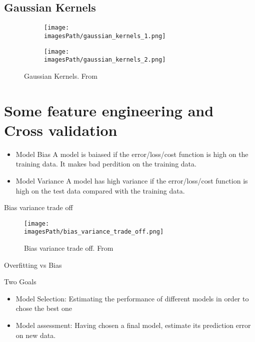 \begin{multicols}{2}
\subsection{Gaussian Kernels}
\begin{figure}
     \centering
     \begin{subfigure}[b]{8cm}
         \centering
         \texttt{[image: \\imagesPath/gaussian\_kernels\_1.png]}
     \end{subfigure}
     \hfill
     \begin{subfigure}[b]{8cm}
         \centering
         \texttt{[image: \\imagesPath/gaussian\_kernels\_2.png]}
     \end{subfigure}
        \caption{Gaussian Kernels. From \cite{iml}}
\end{figure}


\section{Some feature engineering and Cross validation}
\begin{itemize}
    \item Model Bias \newline
    A model is baiased if the error/loss/cost function is high on the training data. It makes bad perdition on the training data.
    \item Model Variance \newline
    A model has high variance if the error/loss/cost function is high on the test data compared with the training data. 
\end{itemize}

Bias variance trade off
\begin{figure}[H]
    \centering
    \texttt{[image: \\imagesPath/bias\_variance\_trade\_off.png]}
    \caption{Bias variance trade off. From \cite{iml}}
\end{figure}

Overfitting vs Bias 

Two Goals
\begin{itemize}
    \item Model Selection: \newline 
    Estimating the performance of different models in order to chose the best one 
    \item Model assessment: \newline 
    Having chosen a final model, estimate its prediction error on new data. 
\end{itemize}


\end{multicols}
